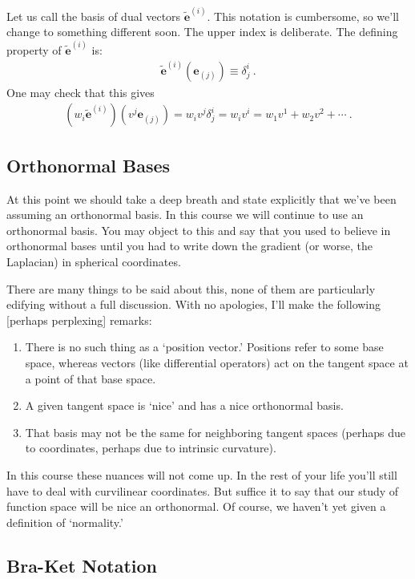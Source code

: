 \documentclass[12pt]{article}
\numberwithin{equation}{section}    %
\renewcommand{\tilde}{\widetilde}   %
\renewcommand{\vec}[1]{\mathbf{#1}} %
\begin{document}
Let us call the basis of dual vectors $\tilde{\vec{e}}^{(i)}$. This notation is cumbersome, so we’ll change to something different soon. The upper index is deliberate. The defining property of $\tilde{\vec{e}}^{(i)}$ is:
\begin{align}
  \tilde{\vec{e}}^{(i)}\left(\vec{e}_{(j)}\right) \equiv \delta^i_j \ .
\end{align}
One may check that this gives
\begin{align}
  \left(w_i\tilde{\vec{e}}^{(i)}\right)\left(v^j\vec{e}_{(j)}\right)
  = w_i v^j \delta^i_j = w_i v^i = w_1 v^1 + w_2 v^2 + \cdots \ .
\end{align}



\subsection{Orthonormal Bases}

At this point we should take a deep breath and state explicitly that we’ve been assuming an orthonormal basis. In this course we will continue to use an orthonormal basis. You may object to this and say that you used to believe in orthonormal bases until you had to write down the gradient (or worse, the Laplacian) in spherical coordinates. 

There are many things to be said about this, none of them are particularly edifying without a full discussion. With no apologies, I’ll make the following [perhaps perplexing] remarks:
\begin{enumerate}
\item There is no such thing as a `position vector.' Positions refer to some base space, whereas vectors (like differential operators) act on the tangent space at a point of that base space. 
\item A given tangent space is `nice’ and has a nice orthonormal basis. 
\item That basis may not be the same for neighboring tangent spaces (perhaps due to coordinates, perhaps due to intrinsic curvature). 
\end{enumerate}
In this course these nuances will not come up. In the rest of your life you’ll still have to deal with curvilinear coordinates. But suffice it to say that our study of function space will be nice an orthonormal. Of course, we haven’t yet given a definition of `normality.’

\subsection{Bra-Ket Notation}
\end{document}
